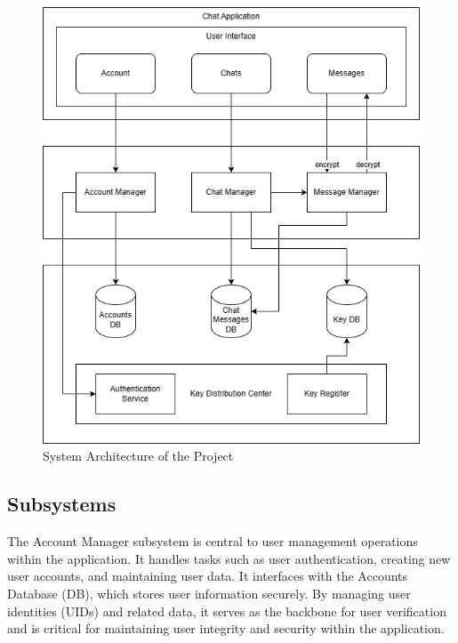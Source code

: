 \documentclass[]{article}
\begin{document}
\begin{figure}[H]
	\centering
	\includegraphics[width=1\textwidth]{architecture_diagram.drawio.png}
	\caption{System Architecture of the Project}
\end{figure}


\subsection{Subsystems}
\label{sub:subsystems}

	The Account Manager subsystem is central to user management operations within the application. It handles tasks such as user authentication, creating new user accounts, and maintaining user data. It interfaces with the Accounts Database (DB), which stores user information securely. By managing user identities (UIDs) and related data, it serves as the backbone for user verification and is critical for maintaining user integrity and security within the application. \\
\end{document}
